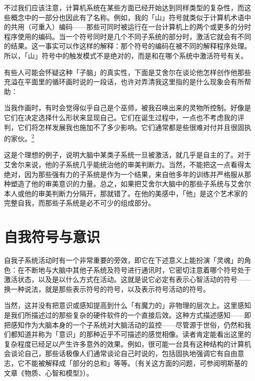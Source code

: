 \documentclass[
  12pt,
  twoside,
  openright,
  oldfontcommands,
]{memoir}
\newenvironment{fsquote}{%
  \begin{mdframed}[style=gebquote]\kaitifamily\small%
}{%
  \end{mdframed}%
}
\begin{document}
不过我们应该注意，计算机系统在某些方面已经开始达到同样类型的复杂性，而这些概念中的一部分也因此有了名称。例如，我的「山」符号就类似于计算机术语中的共用（可重入）编码------那些可同时被运行在一台计算机上的两个或更多的分时程序使用的编码。当一个符号同时是几个不同子系统的部分时，激活它就会有不同的结果。这一事实可以作这样的解释：那个符号的编码在被不同的解释程序处理。所以，「山」符号中的触发模式不是绝对的，而是和在哪个系统中激活符号有关。

有些人可能会怀疑这种「子脑」的真实性，下面是艾舍尔在谈论他怎样创作他那些充溢在平面里的循环画时说的一段话，也许对弄清我这里指的是什么现象会有所帮助：

\begin{fsquote}
当我作画时，有时会觉得似乎自己是个巫师，被我召唤出来的灵物所控制。好像是它们在决定选择什么形状来显现自己。它们在诞生过程中，一点也不考虑我的评判，它们将怎样发展我也施加不了多少影响。它们通常都是些很难对付并且很固执的家伙。\hyperref[fn:Chapter12-2]{\textsuperscript{2}}
\end{fsquote}

这是个理想的例子，说明大脑中某类子系统一旦被激活，就几乎是自主的了。对于艾舍尔来说，他的子系统几乎能统治他的审美判断力。当然，不能把这一点看得太绝对，因为那些强有力的子系统是作为一个结果，来自他多年的训练并严格服从那种塑造了他的审美意识的力量。总之，如果把艾舍尔大脑中的那些子系统与艾舍尔本人或他的审美判断力分隔开，那就错了。在他的美感中，「他」是这个艺术家的完整自我，而那些子系统是必不可少的组成部分。

\section{自我符号与意识}

自我子系统活动时有一个非常重要的旁效，即它在下述意义上能扮演「灵魂」的角色：在不断地与大脑中其他子系统及符号进行通讯时，它密切注意着哪个符号处于激活状态，以及是以什么方式在活动。这就是说它必定有表示心智活动的符号------换一种说法，就是那些表示符号的符号，以及表示符号活动的符号。

当然，这并没有把意识或感知提高到什么「有魔力的」非物理的层次上。这里感知是我们所描述过的那些复杂的硬件软件的一个直接后效。这种方式描述感知------即把感知作为大脑本身的一个子系统对大脑活动的监控------尽管源于世俗，仍然和我们都知道并称为「意识」的那种近乎不可描述的感觉相像。读者肯定能看出这里的复杂程度已经足以产生许多意外的效果。例如，很可能一台具有这种结构的计算机会谈论自己，那些话极像人们通常谈论自己时说的，包括固执地强调它有自由意志，它不能被解释成「部分的总和」等等。（有关这方面的问题，可参阅明斯基的文章《物质、心智和模型》）。
\end{document}
